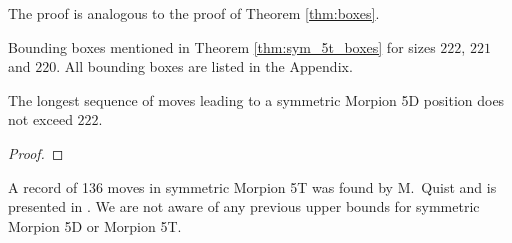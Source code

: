 The proof is analogous to the proof of Theorem \ref{thm:boxes}. %

\begin{table}[ht]
\centering
 

\caption{Bounding boxes mentioned in Theorem \ref{thm:sym_5t_boxes} for sizes $222$, $221$ and $220$. All bounding boxes are listed in the Appendix. }
\label{tbl:sym_5t_boundingboxes}
\end{table}

\begin{corollary}
\label{cor:222}
The longest sequence of moves leading to a symmetric Morpion 5D position does not exceed $222$.
\end{corollary}
\begin{proof} 

\end{proof}

\begin{remark}
A record of 136 moves in symmetric Morpion 5T was found by M.~Quist and is presented in \cite{boyer}. We are not aware of any previous upper bounds for symmetric Morpion 5D or Morpion 5T.
\end{remark}
